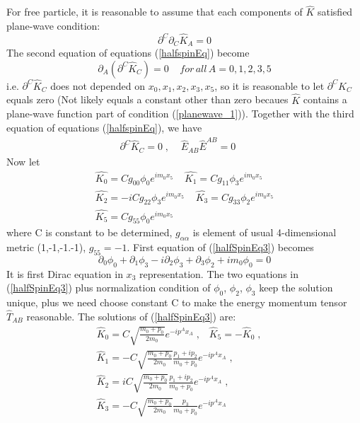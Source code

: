 \documentclass[twocolumn,showpacs,preprintnumbers,amsmath,amssymb]{revtex4}
\begin{document}
For free particle, it is reasonable to assume that each components of $\hat{K}$ satisfied plane-wave condition:
\begin{equation}
\partial^{C} \partial_{C} \hat{K}_{A} = 0
\label{planewave_1}
\end{equation}
The second equation of equations (\ref{halfspinEq}) become
\begin{equation}
\partial_{A} (\partial^{C} \hat{K}_{C})  =  0  \; \; \; \; for \, all \, A = 0,1,2,3,5
\label{halfSpinEq2}
\end{equation}
i.e. $\partial^{C} \hat{K}_{C} $ does not depended on $x_0,x_1,x_2,x_3,x_5$, 
 so it is reasonable to let
$\partial^{C} \hat{K}_{C} $ equals zero (Not likely equals a constant other than zero 
becaues $\hat{K}$ contains
a plane-wave function part of condition (\ref{planewave_1})). Together with the third equation of 
equations (\ref{halfspinEq}), we have
\begin{eqnarray}
\partial^{C} \hat{K}_{C}  = 0  \;, \; \; \; \; 
\hat{E}_{AB} \hat{E}^{AB} = 0   \; \; \; \; \;
\label{halfSpinEq3}
\end{eqnarray}
Now let 
\begin{eqnarray}
\hat{K_0} = Cg_{00}\phi_0 e^{im_0 x_5}   \; \; \; \;
\hat{K_1} = Cg_{11}\phi_3 e^{im_0 x_5}  \nonumber \\ 
\hat{K_2} = -iCg_{22} \phi_3 e^{im_0 x_5} \; \; \; \;
\hat{K_3} = Cg_{33}\phi_2 e^{im_0 x_5}  \nonumber \\ 
\hat{K_5} = Cg_{55}\phi_0 e^{im_0 x_5}   
\label{HalfSpinVector}
\end{eqnarray}
where C is constant to be determined, $g_{\alpha \alpha}$ is element of usual 4-dimensional metric (1,-1,-1.-1), $g_{55} = -1$. 
First equation of (\ref{halfSpinEq3}) becomes 
\begin{equation}
\partial_{0} \phi_0 + \partial_{1} \phi_3 - i \partial_{2} \phi_3 + \partial_3 \phi_2 + im_0 \phi_0 = 0
\label{ModifiedDirac}
\end{equation}
It is first Dirac equation in $x_3$ representation. The two equations in (\ref{halfSpinEq3}) plus normalization
condition of $\phi_0$, $\phi_2$, $\phi_3$ keep the solution unique, plus we need choose constant C to make the energy momentum
tensor $\hat{T}_{AB}$ reasonable. The solutions of  (\ref{halfSpinEq3}) are:
\begin{eqnarray}
\hat{K}_0 = C \sqrt{\frac{m_0+p_0 }{2m_0}} e^{-i p^A x_{A}}\;, \; \; \; \hat{K}_5 = - \hat{K}_0 \;, \;  \; \; \ \nonumber \\
\hat{K}_1 = -C\sqrt{\frac{m_0+p_0 }{2m_0}} \frac{p_1 + ip_2}{m_0+p_0} e^{-i p^A x_{A}}  \;, \; \; \; \;  \nonumber \\
\hat{K}_2 = iC\sqrt{\frac{m_0+p_0 }{2m_0}} \frac{p_1 + ip_2}{m_0+p_0} e^{-i p^A x_{A}}  \;, \; \; \; \;  \nonumber \\
\hat{K}_3 = -C\sqrt{\frac{m_0+p_0 }{2m_0}} \frac{p_3}{m_0+p_0} e^{-i p^A x_{A}} \; \;  \; \; \;  
\label{DComponents}
\end{eqnarray}
\end{document}
